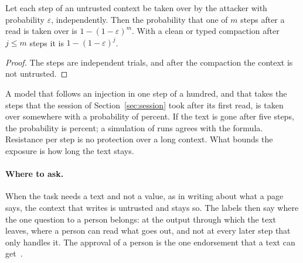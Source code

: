 \documentclass[acmsmall,nonacm,screen]{acmart}
\newcommand{\claim}[2]{#2}
\begin{document}
\begin{proposition}
\label{prop:retried}
Let each step of an untrusted context be taken over by the attacker with probability
$\varepsilon$, independently. Then the probability that one of $m$ steps after a read is taken
over is $1 - (1 - \varepsilon)^m$. With a clean or typed compaction after $j \le m$ steps it
is $1 - (1 - \varepsilon)^j$.
\end{proposition}

\begin{proof}
The steps are independent trials, and after the compaction the context is not untrusted.
\end{proof}

\claim{retried}{A model that follows an injection in one step of a hundred, and that takes
the \exSessionAfter{} steps that the session of Section~\ref{sec:session} took after its
first read, is taken over somewhere with a probability of \exRetryWhole{} percent. If the
text is gone after five steps, the probability is \exRetryFive{} percent; a simulation of
\exRetryTrials{} runs agrees with the formula.} Resistance per step
is no protection over a long context. What bounds the exposure is how long the text stays.

\paragraph{Where to ask.} When the task needs a text and not a value, as in writing about
what a page says, the context that writes is untrusted and stays so. The labels then say
where the one question to a person belongs: at the output through which the text leaves,
where a person can read what goes out, and not at every later step that only handles it.
The approval of a person is the one endorsement that a text can get~\cite{tpp4,tpp7}.
\end{document}
